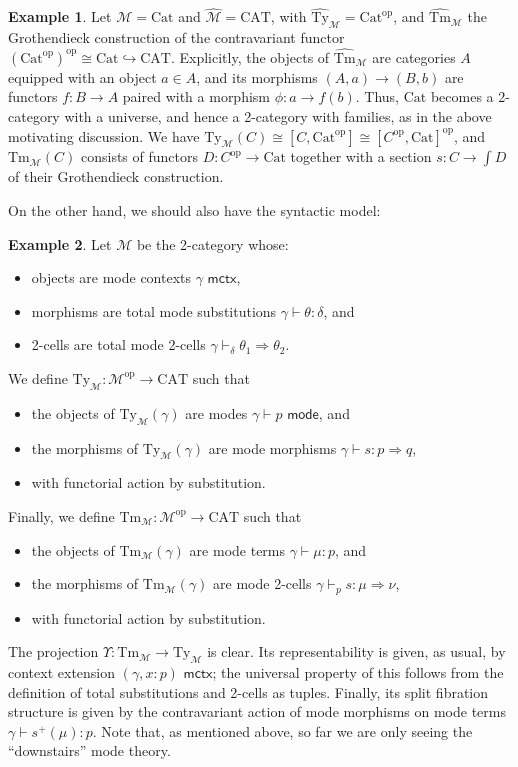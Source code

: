 \documentclass[10pt]{article}
\theoremstyle{definition}
\newtheorem{example}{Example}
\newcommand{\yields}{\vdash}
\newcommand{\tcell}{\Rightarrow}
\newcommand{\ctx}{\,\,\mathsf{mctx}}
\newcommand{\type}{\,\,\mathsf{mode}}
\newcommand\TypeTwo[4]{\ensuremath{#1 \vdash #2 :  #3 \tcell #4}}
\newcommand\TermTwoT[5]{\ensuremath{#1 \vdash_{#5} {#2} : #3 \tcell #4}}
\newcommand\TrPlus[2]{\ensuremath{{#1}^+(#2)}}
\newcommand\op{^{\mathrm{op}}}
\newcommand\Cat{\mathrm{Cat}}
\newcommand\CAT{\mathrm{CAT}}
\newcommand\M{\mathcal{M}}
\newcommand\Mhat{\widehat{\mathcal{M}}}
\newcommand\Mty{{\mathrm{Ty}_{\M}}}
\newcommand\Mtm{{\mathrm{Tm}_{\M}}}
\newcommand\Mtyhat{{\widehat{\mathrm{Ty}}_{\M}}}
\newcommand\Mtmhat{{\widehat{\mathrm{Tm}}_{\M}}}
\newcommand\Ups{\Upsilon}
\begin{document}
\begin{example}\label{eg:cat-2cwf}
  Let $\M=\Cat$ and $\Mhat=\CAT$, with $\Mtyhat = \Cat\op$, and $\Mtmhat$ the Grothendieck construction of the contravariant functor $(\Cat\op)\op \cong \Cat \hookrightarrow \CAT$.
  Explicitly, the objects of $\Mtmhat$ are categories $A$ equipped with an object $a\in A$, and its morphisms $(A,a) \to (B,b)$ are functors $f:B\to A$ paired with a morphism $\phi : a\to f(b)$.
  Thus, $\Cat$ becomes a 2-category with a universe, and hence a 2-category with families, as in the above motivating discussion.
  We have $\Mty(C) \cong [C,\Cat\op] \cong [C\op,\Cat]\op$, and $\Mtm(C)$ consists of functors $D:C\op\to\Cat$ together with a section $s:C\to \int D$ of their Grothendieck construction.
\end{example}

On the other hand, we should also have the syntactic model:

\begin{example}\label{eg:syn-2cwf}
  Let $\M$ be the 2-category whose:
  \begin{itemize}
  \item objects are mode contexts $\gamma \ctx$,
  \item morphisms are total mode substitutions $\gamma \yields \theta : \delta$, and
  \item 2-cells are total mode 2-cells $\gamma \yields_\delta \theta_1 \tcell \theta_2$.
  \end{itemize}
  We define $\Mty:\M\op\to\CAT$ such that
  \begin{itemize}
  \item the objects of $\Mty(\gamma)$ are modes $\gamma \yields p\type$, and
  \item the morphisms of $\Mty(\gamma)$ are mode morphisms $\TypeTwo{\gamma}{s}{p}{q}$,
  \item with functorial action by substitution.
  \end{itemize}
  Finally, we define $\Mtm:\M\op\to\CAT$ such that
  \begin{itemize}
  \item the objects of $\Mtm(\gamma)$ are mode terms $\gamma \yields \mu:p$, and
  \item the morphisms of $\Mtm(\gamma)$ are mode 2-cells $\TermTwoT{\gamma}{s}{\mu}{\nu}{p}$,
  \item with functorial action by substitution.
  \end{itemize}
  The projection $\Ups:\Mtm\to\Mty$ is clear.
  Its representability is given, as usual, by context extension $(\gamma, x:p) \ctx$; the universal property of this follows from the definition of total substitutions and 2-cells as tuples.
  Finally, its split fibration structure is given by the contravariant action of mode morphisms on mode terms ${\gamma \yields \TrPlus{s}{\mu} : p}$.
  Note that, as mentioned above, so far we are only seeing the ``downstairs'' mode theory.
\end{example}
\end{document}
